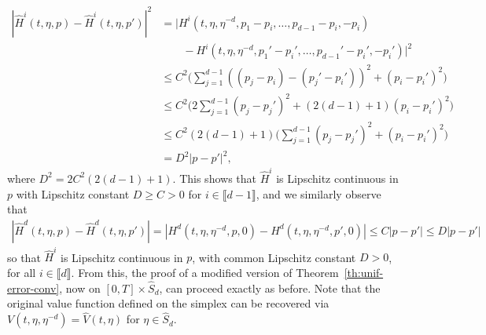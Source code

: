 \documentclass[11pt,reqno]{amsart}
\numberwithin{equation}{section}
\theoremstyle{plain}
\newcommand{\lbrs}[1]{\llbracket #1 \rrbracket}
\begin{document}
\begin{align*}
    |\widehat{H}^i(t, \eta, p) - \widehat{H}^i(t, \eta, p')|^2 &= |H^i(t, \eta, \eta^{-d}, p_1 - p_i, \ldots, p_{d-1} - p_i, -p_{i}) \\
    &\qquad - H^i(t, \eta, \eta^{-d}, p_1' - p_i', \ldots, p_{d-1}' - p_i', -p_{i}')|^2 \\
    &\leq C^2 \Big(\sum_{j=1}^{d-1} ((p_j - p_i) - (p_j' - p_i'))^2 + (p_i - p_i')^2 \Big)\\
    &\leq C^2 \Big(2\sum_{j=1}^{d-1} (p_j - p_j')^2 + (2(d-1) + 1)(p_i - p_i')^2\Big) \\
    &\leq C^2(2(d-1) + 1) \Big(\sum_{j=1}^{d-1} (p_j - p_j')^2 + (p_i - p_i')^2\Big) \\
    &= D^2 |p - p'|^2,
\end{align*}
where $D^2 = 2C^2(2(d-1) + 1)$. This shows that $\widehat{H}^i$ is Lipschitz continuous in $p$ with Lipschitz constant $D \geq C > 0$ for $i \in \lbrs{d-1}$, and we similarly observe that
\begin{align*}
    |\widehat{H}^d(t, \eta, p) - \widehat{H}^d(t, \eta, p')| = |H^d(t, \eta, \eta^{-d}, p, 0) - H^d(t, \eta, \eta^{-d}, p', 0)| \leq C|p - p'| \leq D|p - p'|
\end{align*}
so that $\widehat{H}^i$ is Lipschitz continuous in $p$, with common Lipschitz constant $D > 0$, for all $i \in \lbrs{d}$. From this, the proof of a modified version of Theorem~\ref{th:unif-error-conv}, now on $[0, T] \times \widehat{S}_d$, can proceed exactly as before. Note that the original value function defined on the simplex can be recovered via $V(t, \eta, \eta^{-d}) = \widehat{V}(t, \eta)$ for $\eta \in \widehat{S}_d$. 
\end{document}
